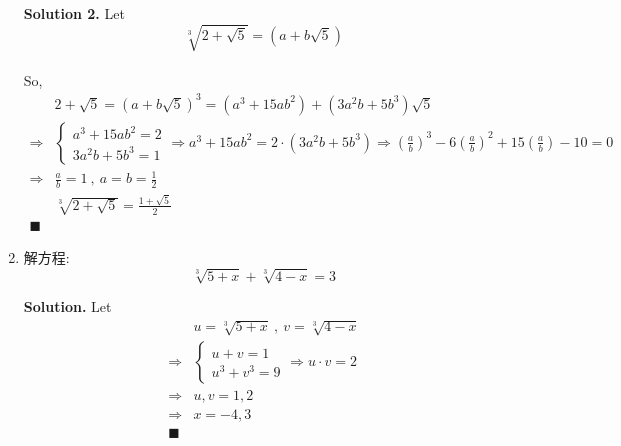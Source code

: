 \documentclass[UTF8]{article}
\begin{document}
\begin{enumerate}
    \noindent \textbf{Solution 2.}  Let $$ \sqrt[3]{2+\sqrt{5}} = (a + b \sqrt{5}) $$ \\
    So, 
    \begin{align*}
        & 2 + \sqrt{5} = (a+b\sqrt{5})^3 = (a^3 + 15ab^2) + (3a^2b + 5b^3)\sqrt{5} \\
        \Longrightarrow & \left\{
            \begin{aligned}
                a^3 + 15ab^2 = 2 \\
                3a^2b + 5b^3 = 1
            \end{aligned}
            \Longrightarrow a^3 + 15ab^2 = 2 \cdot (3a^2b + 5b^3)
            \Longrightarrow (\frac{a}{b})^3 -6(\frac{a}{b})^2 + 15(\frac{a}{b}) -10 = 0
            \right. \\
            \Longrightarrow & \frac{a}{b} = 1 \  , \  a = b = \frac{1}{2} \\
            & \sqrt[3]{2 + \sqrt{5}} = \frac{1+\sqrt{5}}{2} \\
            \blacksquare
        \end{align*}

        \item 解方程: $$ \sqrt[3]{5+x} +  \sqrt[3]{4-x} = 3 $$
        
        \noindent \textbf{Solution. }  Let
        \begin{align*}
           & u = \sqrt[3]{5+x} \ , \ v = \sqrt[3]{4-x} \\
            \Longrightarrow &
            \left \{
                \begin{aligned}
                u + v = 1 \\
                u^3 + v^3 = 9
                \end{aligned}
                \Longrightarrow u \cdot v = 2
            \right. \\
            \Longrightarrow & u,v = 1,2 \\
            \Longrightarrow & x = -4, 3 \\
            \blacksquare 
        \end{align*}


    \end{enumerate}
\end{document}
